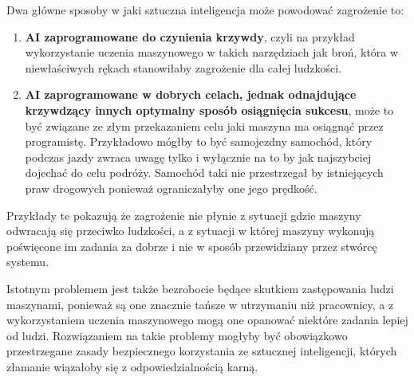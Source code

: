 Dwa główne sposoby w jaki sztuczna inteligencja może powodować zagrożenie to:
\begin{enumerate}
    \item \textbf{AI zaprogramowane do czynienia krzywdy}, czyli na przykład wykorzystanie uczenia maszynowego
    w takich narzędziach jak broń, która w niewłaściwych rękach stanowiłaby zagrożenie dla całej ludzkości.
    \item \textbf{AI zaprogramowane w dobrych celach, jednak odnajdujące krzywdzący innych optymalny
    sposób osiągnięcia sukcesu}, może to być związane ze złym przekazaniem celu jaki maszyna ma osiągnąć przez 
    programistę. Przykładowo mógłby to być samojezdny samochód, który podczas jazdy zwraca uwagę tylko i wyłącznie 
    na to by jak najszybciej dojechać do celu podróży. Samochód taki nie przestrzegał by istniejących praw drogowych
    ponieważ ograniczałyby one jego prędkość.
\end{enumerate}
Przykłady te pokazują że zagrożenie nie płynie z sytuacji gdzie maszyny odwracają się przeciwko ludzkości, a 
z sytuacji w której maszyny wykonują poświęcone im zadania za dobrze i nie w sposób przewidziany przez 
stwórcę systemu.

Istotnym problemem jest także bezrobocie będące skutkiem zastępowania ludzi maszynami,
ponieważ są one znacznie tańsze w utrzymaniu niż pracownicy, a z wykorzystaniem uczenia
maszynowego mogą one opanować niektóre zadania lepiej od ludzi.
Rozwiązaniem na takie problemy mogłyby być obowiązkowo przestrzegane zasady bezpiecznego korzystania
ze sztucznej inteligencji, których złamanie wiązałoby się z odpowiedzialnością karną.